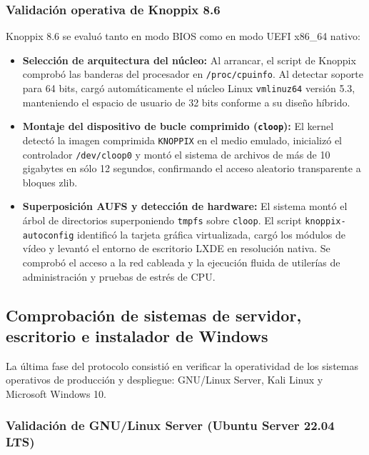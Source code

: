\documentclass[12pt]{article}
\begin{document}
\subsubsection{Validación operativa de Knoppix 8.6}

Knoppix 8.6 se evaluó tanto en modo BIOS como en modo UEFI x86\_64 nativo:
\begin{itemize}[noitemsep, topsep=2pt]
    \item \textbf{Selección de arquitectura del núcleo:} Al arrancar, el script de Knoppix comprobó las banderas del procesador en \texttt{/proc/cpuinfo}. Al detectar soporte para 64 bits, cargó automáticamente el núcleo Linux \texttt{vmlinuz64} versión 5.3, manteniendo el espacio de usuario de 32 bits conforme a su diseño híbrido.
    \item \textbf{Montaje del dispositivo de bucle comprimido (\texttt{cloop}):} El kernel detectó la imagen comprimida \texttt{KNOPPIX} en el medio emulado, inicializó el controlador \texttt{/dev/cloop0} y montó el sistema de archivos de más de 10 gigabytes en sólo 12 segundos, confirmando el acceso aleatorio transparente a bloques zlib.
    \item \textbf{Superposición AUFS y detección de hardware:} El sistema montó el árbol de directorios superponiendo \texttt{tmpfs} sobre \texttt{cloop}. El script \texttt{knoppix-autoconfig} identificó la tarjeta gráfica virtualizada, cargó los módulos de vídeo y levantó el entorno de escritorio LXDE en resolución nativa. Se comprobó el acceso a la red cableada y la ejecución fluida de utilerías de administración y pruebas de estrés de CPU.
\end{itemize}

\subsection{Comprobación de sistemas de servidor, escritorio e instalador de Windows}
\label{sec:comprobacionSistemas}

La última fase del protocolo consistió en verificar la operatividad de los sistemas operativos de producción y despliegue: GNU/Linux Server, Kali Linux y Microsoft Windows 10.

\subsubsection{Validación de GNU/Linux Server (Ubuntu Server 22.04 LTS)}
\end{document}
